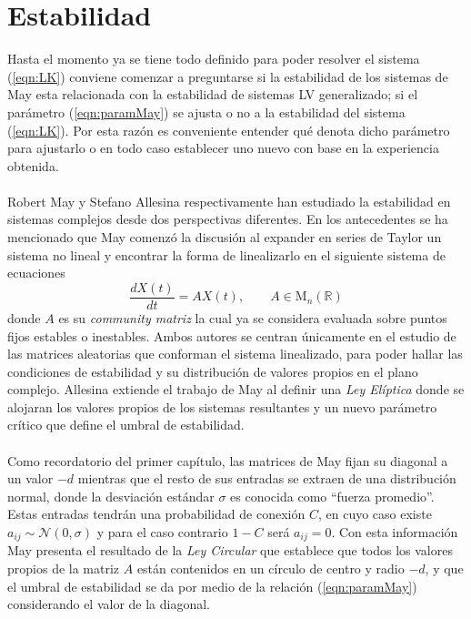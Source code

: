 \section{Estabilidad}

Hasta el momento ya se tiene todo definido para poder resolver el sistema (\ref{eqn:LK}) conviene comenzar a preguntarse si la estabilidad de los sistemas de May esta relacionada con la estabilidad de sistemas LV generalizado; si el parámetro (\ref{eqn:paramMay}) se ajusta o no a la estabilidad del sistema (\ref{eqn:LK}). Por esta razón es conveniente entender qué denota dicho parámetro para ajustarlo o en todo caso establecer uno nuevo con base en la experiencia obtenida.
\\
\\
Robert May \cite{may2019stability} y Stefano Allesina \cite{allesina2012stability} respectivamente han estudiado la estabilidad en sistemas complejos desde dos perspectivas diferentes. En los antecedentes se ha mencionado que May comenzó la discusión al expander en series de Taylor un sistema no lineal y encontrar la forma de linealizarlo en el siguiente sistema de ecuaciones
\begin{equation}\label{eqn:sistemasMay}
	\frac{dX(t)}{dt}=AX(t),\qquad A\in\mathrm{M}_n(\mathbb{R})
\end{equation}
donde $A$ es su \textit{community matriz} la cual ya se considera evaluada sobre puntos fijos estables o inestables. Ambos autores se centran únicamente en el estudio de las matrices aleatorias que conforman el sistema linealizado, para poder hallar las condiciones de estabilidad y su distribución de valores propios en el plano complejo. Allesina extiende el trabajo de May al definir una \textit{Ley Elíptica} donde se alojaran los valores propios de los sistemas resultantes y un nuevo parámetro crítico que define el umbral de estabilidad. 
\\
\\
Como recordatorio del primer capítulo, las matrices de May fijan su diagonal a un valor $-d$ mientras que el resto de sus entradas se extraen de una distribución normal, donde la desviación estándar $\sigma$ es conocida como ``fuerza promedio''. Estas entradas tendrán una probabilidad de conexión $C$, en cuyo caso existe $a_{ij}\sim\mathcal{N}(0,\sigma)$ y para el caso contrario $1-C$ será $a_{ij}=0$. Con esta información May presenta el resultado de la \textit{Ley Circular} que establece que todos los valores propios de la matriz $A$ están contenidos en un círculo de centro y radio $-d$, y que el umbral de estabilidad se da por medio de la relación (\ref{eqn:paramMay}) considerando el valor de la diagonal. 
